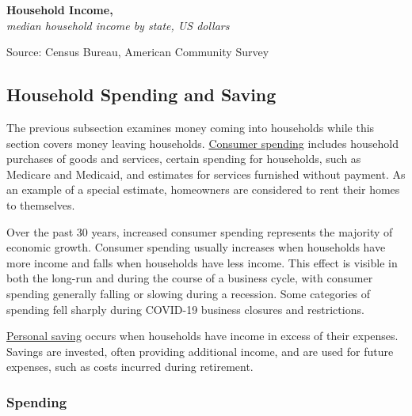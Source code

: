 \documentclass{report}
\newcommand{\tbllink}[1]{\href{https://raw.githubusercontent.com/bdecon/US-chartbook/master/chartbook/data/#1}{\faTable}}
\begin{document}
{\normalsize \textbf{Household Income, }\\
\footnotesize{\textit{median household income by state, US dollars}}
\vspace{-3mm}

\hspace{-5mm} 
\vspace{-6mm}

\begin{minipage}{0.76\textwidth} 
\footnotesize{Source: Census Bureau, American Community Survey} \hfill \tbllink{median_hh_inc_state.csv}
\end{minipage}
\newpage 
\begin{minipage}{0.76\textwidth}  
\subsection*{Household Spending and Saving}
\hypertarget{hhss}{\label{hhss}} 
\small The previous subsection examines money coming into households while this section covers money leaving households. \href{https://www.bea.gov/data/consumer-spending/main}{Consumer spending} includes household purchases of goods and services, certain spending for households, such as Medicare and Medicaid, and estimates for services furnished without payment. As an example of a special estimate, homeowners are considered to rent their homes to themselves. 

Over the past 30 years, increased consumer spending represents the majority of economic growth. Consumer spending usually increases when households have more income and falls when households have less income. This effect is visible in both the long-run and during the course of a business cycle, with consumer spending generally falling or slowing during a recession. Some categories of spending fell sharply during COVID-19 business closures and restrictions.

\href{https://www.bea.gov/data/income-saving/personal-saving-rate}{Personal saving} occurs when households have income in excess of their expenses. Savings are invested, often providing additional income, and are used for future expenses, such as costs incurred during retirement.
\vspace{1mm}

\subsubsection*{Spending}
\vspace{-1mm}


\end{minipage}}
\end{document}
